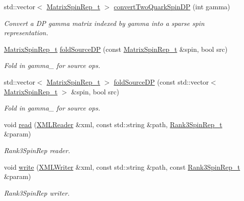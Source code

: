 \begin{DoxyCompactItemize}
std\+::vector$<$ \mbox{\hyperlink{structHadron_1_1MatrixSpinRep__t}{Matrix\+Spin\+Rep\+\_\+t}} $>$ \mbox{\hyperlink{namespaceHadron_a9d2555db4b8f920142f7c79e6752eccd}{convert\+Two\+Quark\+Spin\+DP}} (int gamma)
\begin{DoxyCompactList}\small\item\em Convert a DP gamma matrix indexed by gamma into a sparse spin representation. \end{DoxyCompactList}\item 
\mbox{\hyperlink{structHadron_1_1MatrixSpinRep__t}{Matrix\+Spin\+Rep\+\_\+t}} \mbox{\hyperlink{namespaceHadron_aa258f26ea52528eac314f32a02bf8ac3}{fold\+Source\+DP}} (const \mbox{\hyperlink{structHadron_1_1MatrixSpinRep__t}{Matrix\+Spin\+Rep\+\_\+t}} \&spin, bool src)
\begin{DoxyCompactList}\small\item\em Fold in gamma\+\_ for source ops. \end{DoxyCompactList}\item 
std\+::vector$<$ \mbox{\hyperlink{structHadron_1_1MatrixSpinRep__t}{Matrix\+Spin\+Rep\+\_\+t}} $>$ \mbox{\hyperlink{namespaceHadron_a26162db6431302c5e52fbd5fafdbedae}{fold\+Source\+DP}} (const std\+::vector$<$ \mbox{\hyperlink{structHadron_1_1MatrixSpinRep__t}{Matrix\+Spin\+Rep\+\_\+t}} $>$ \&spin, bool src)
\begin{DoxyCompactList}\small\item\em Fold in gamma\+\_ for source ops. \end{DoxyCompactList}\item 
void \mbox{\hyperlink{namespaceHadron_a2d26ed6a48c098506babe8e03425a183}{read}} (\mbox{\hyperlink{classADATXML_1_1XMLReader}{X\+M\+L\+Reader}} \&xml, const std\+::string \&path, \mbox{\hyperlink{structHadron_1_1Rank3SpinRep__t}{Rank3\+Spin\+Rep\+\_\+t}} \&param)
\begin{DoxyCompactList}\small\item\em Rank3\+Spin\+Rep reader. \end{DoxyCompactList}\item 
void \mbox{\hyperlink{namespaceHadron_a4286761aeb6d750c12bfba02d54b2b12}{write}} (\mbox{\hyperlink{classADATXML_1_1XMLWriter}{X\+M\+L\+Writer}} \&xml, const std\+::string \&path, const \mbox{\hyperlink{structHadron_1_1Rank3SpinRep__t}{Rank3\+Spin\+Rep\+\_\+t}} \&param)
\begin{DoxyCompactList}\small\item\em Rank3\+Spin\+Rep writer. \end{DoxyCompactList}\item 

\end{DoxyCompactItemize}
